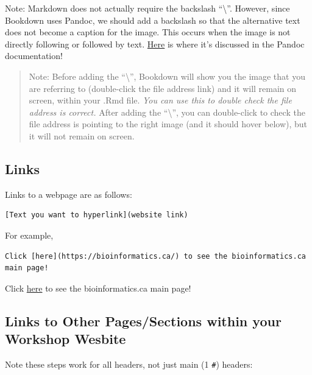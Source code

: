 \documentclass[
]{book}
\theoremstyle{definition}
\theoremstyle{definition}
\theoremstyle{definition}
\theoremstyle{definition}
\theoremstyle{remark}
\begin{document}
Note: Markdown does not actually require the backslash ``\textbackslash{}''. However, since Bookdown uses Pandoc, we should add a backslash so that the alternative text does not become a caption for the image. This occurs when the image is not directly following or followed by text. \href{https://pandoc.org/MANUAL.html\#extension-implicit_figures}{Here} is where it's discussed in the Pandoc documentation!

\begin{quote}
Note: Before adding the ``\textbackslash{}'', Bookdown will show you the image that you are referring to (double-click the file address link) and it will remain on screen, within your .Rmd file. \emph{You can use this to double check the file address is correct.} After adding the ``\textbackslash{}'', you can double-click to check the file address is pointing to the right image (and it should hover below), but it will not remain on screen.
\end{quote}

\subsection*{Links}\label{links}

Links to a webpage are as follows:

\begin{verbatim}
[Text you want to hyperlink](website link)
\end{verbatim}

For example,

\begin{verbatim}
Click [here](https://bioinformatics.ca/) to see the bioinformatics.ca main page!
\end{verbatim}

Click \href{https://bioinformatics.ca/}{here} to see the bioinformatics.ca main page!

\subsection*{Links to Other Pages/Sections within your Workshop Wesbite}\label{links-to-other-pagessections-within-your-workshop-wesbite}

Note these steps work for all headers, not just main (1 \texttt{\#}) headers:
\end{document}
